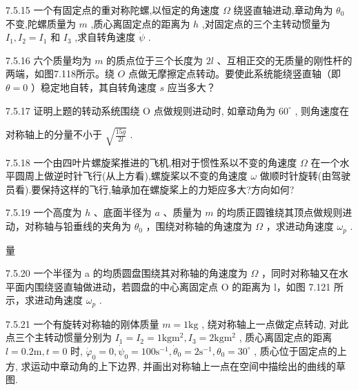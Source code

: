 \begin{problem}{7.5.15}
一个有固定点的重对称陀螺,以恒定的角速度 $\Omega$ 绕竖直轴进动,章动角为 $\theta_0$ 不变,陀螺质量为 $m$ ,质心离固定点的距离为 $h$ ,对固定点的三个主转动惯量为 $I_1,I_2 = I_1$ 和 $I_3$ ,求自转角速度 $\dot{\psi}$ .
\end{problem}
\clearpage


\begin{problem}{7.5.16}
六个质量均为 $m$ 的质点位于三个长度为 $2l$ 、互相正交的无质量的刚性杆的两端，如图7.118所示。绕 $O$ 点做无摩擦定点转动。要使此系统能绕竖直轴（即 $\theta = 0$ ）稳定地自转，其自转角速度 $s$ 应当多大？
\begin{center}

\end{center}
\end{problem}
\clearpage


\begin{problem}{7.5.17}
证明上题的转动系统围绕 O 点做规则进动时, 如章动角为 $60^{\circ}$ , 则角速度在

对称轴上的分量不小于 $\sqrt{\frac{15g}{2l}}$ .
\end{problem}
\clearpage


\begin{problem}{7.5.18}
一个由四叶片螺旋桨推进的飞机,相对于惯性系以不变的角速度 $\Omega$ 在一个水平圆周上做逆时针飞行(从上方看),螺旋桨以不变的角速度 $\omega$ 做顺时针旋转(由驾驶员看).要保持这样的飞行,轴承加在螺旋桨上的力矩应多大?方向如何?
\end{problem}
\clearpage


\begin{problem}{7.5.19}
一个高度为 $h$ 、底面半径为 $a$ 、质量为 $m$ 的均质正圆锥绕其顶点做规则进动，对称轴与铅垂线的夹角为 $\theta_0$ ，围绕对称轴的角速度为 $\Omega$ ，求进动角速度 $\omega_p$ .

量
\end{problem}
\clearpage


\begin{problem}{7.5.20}
一个半径为 a 的均质圆盘围绕其对称轴的角速度为 $\Omega$ ，同时对称轴又在水平面内围绕竖直轴做进动，若圆盘的中心离固定点 O 的距离为 l，如图 7.121 所示，求进动角速度 $\omega_{p}$ .
\begin{center}

\end{center}
\end{problem}
\clearpage


\begin{problem}{7.5.21}
一个有旋转对称轴的刚体质量 $m = 1\mathrm{kg}$ , 绕对称轴上一点做定点转动, 对此点三个主转动惯量分别为 $I_{1} = I_{2} = 1\mathrm{kg}\mathrm{m}^{2}, I_{3} = 2\mathrm{kg}\mathrm{m}^{2}$ , 质心离固定点的距离 $l = 0.2\mathrm{m}, t = 0$ 时, $\dot{\varphi}_{0} = 0, \dot{\psi}_{0} = 100\mathrm{s}^{-1}, \dot{\theta}_{0} = 2\mathrm{s}^{-1}, \theta_{0} = 30^{\circ}$ , 质心位于固定点的上方, 求运动中章动角的上下边界, 并画出对称轴上一点在空间中描绘出的曲线的草图.
\end{problem}
\clearpage


